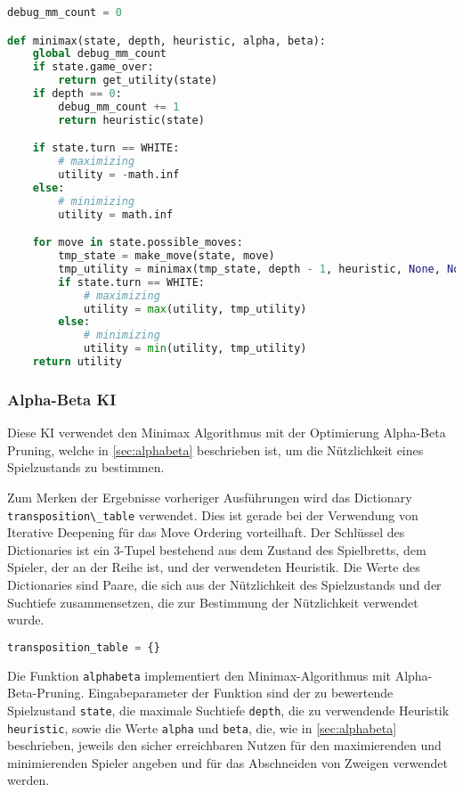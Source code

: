 \begin{lstlisting}[language=Python]
debug_mm_count = 0

def minimax(state, depth, heuristic, alpha, beta):
    global debug_mm_count
    if state.game_over:
        return get_utility(state)
    if depth == 0:
        debug_mm_count += 1
        return heuristic(state)

    if state.turn == WHITE:
        # maximizing
        utility = -math.inf
    else:
        # minimizing
        utility = math.inf

    for move in state.possible_moves:
        tmp_state = make_move(state, move)
        tmp_utility = minimax(tmp_state, depth - 1, heuristic, None, None)
        if state.turn == WHITE:
            # maximizing
            utility = max(utility, tmp_utility)
        else:
            # minimizing
            utility = min(utility, tmp_utility)
    return utility
\end{lstlisting}

\hypertarget{alpha-beta-ki}{%
\subsubsection{Alpha-Beta KI}\label{alpha-beta-ki}}

Diese \ac{KI} verwendet den Minimax Algorithmus mit der Optimierung
Alpha-Beta Pruning, welche in \autoref{sec:alphabeta} beschrieben ist,
um die Nützlichkeit eines Spielzustands zu bestimmen.

Zum Merken der Ergebnisse vorheriger Ausführungen wird das Dictionary
\passthrough{\lstinline!transposition\_table!} verwendet. Dies ist
gerade bei der Verwendung von Iterative Deepening für das Move Ordering
vorteilhaft. Der Schlüssel des Dictionaries ist ein 3-Tupel bestehend
aus dem Zustand des Spielbretts, dem Spieler, der an der Reihe ist, und
der verwendeten Heuristik. Die Werte des Dictionaries sind Paare, die
sich aus der Nützlichkeit des Spielzustands und der Suchtiefe
zusammensetzen, die zur Bestimmung der Nützlichkeit verwendet wurde.

\begin{lstlisting}[language=Python]
transposition_table = {}
\end{lstlisting}

Die Funktion \passthrough{\lstinline!alphabeta!} implementiert den
Minimax-Algorithmus mit Alpha-Beta-Pruning. Eingabeparameter der
Funktion sind der zu bewertende Spielzustand
\passthrough{\lstinline!state!}, die maximale Suchtiefe
\passthrough{\lstinline!depth!}, die zu verwendende Heuristik
\passthrough{\lstinline!heuristic!}, sowie die Werte
\passthrough{\lstinline!alpha!} und \passthrough{\lstinline!beta!}, die,
wie in \autoref{sec:alphabeta} beschrieben, jeweils den sicher
erreichbaren Nutzen für den maximierenden und minimierenden Spieler
angeben und für das Abschneiden von Zweigen verwendet werden.

